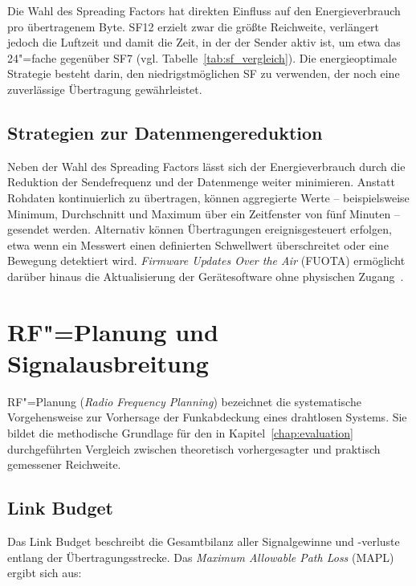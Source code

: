 Die Wahl des Spreading Factors hat direkten Einfluss auf den Energieverbrauch pro
übertragenem Byte. SF12 erzielt zwar die größte Reichweite, verlängert jedoch die
Luftzeit und damit die Zeit, in der der Sender aktiv ist, um etwa das 24"=fache
gegenüber SF7 (vgl. Tabelle~\ref{tab:sf_vergleich}). Die energieoptimale Strategie
besteht darin, den niedrigstmöglichen SF zu verwenden, der noch eine zuverlässige
Übertragung gewährleistet.

\subsection{Strategien zur Datenmengereduktion}
\label{subsec:datenreduktion}

Neben der Wahl des Spreading Factors lässt sich der Energieverbrauch durch die
Reduktion der Sendefrequenz und der Datenmenge weiter minimieren. Anstatt Rohdaten
kontinuierlich zu übertragen, können aggregierte Werte -- beispielsweise Minimum,
Durchschnitt und Maximum über ein Zeitfenster von fünf Minuten -- gesendet werden.
Alternativ können Übertragungen ereignisgesteuert erfolgen, etwa wenn ein Messwert
einen definierten Schwellwert überschreitet oder eine Bewegung detektiert wird.
\textit{Firmware Updates Over the Air} (FUOTA) ermöglicht darüber hinaus die
Aktualisierung der Gerätesoftware ohne physischen Zugang~\cite{semtech_lora_basics}.

\section{RF"=Planung und Signalausbreitung}
\label{sec:rf-planung}

RF"=Planung (\textit{Radio Frequency Planning}) bezeichnet die systematische
Vorgehensweise zur Vorhersage der Funkabdeckung eines drahtlosen Systems.
Sie bildet die methodische Grundlage für den in Kapitel~\ref{chap:evaluation}
durchgeführten Vergleich zwischen theoretisch vorhergesagter und praktisch
gemessener Reichweite.

\subsection{Link Budget}
\label{subsec:link-budget}

Das Link Budget beschreibt die Gesamtbilanz aller Signalgewinne und -verluste
entlang der Übertragungsstrecke. Das \textit{Maximum Allowable Path Loss} (MAPL)
ergibt sich aus:

